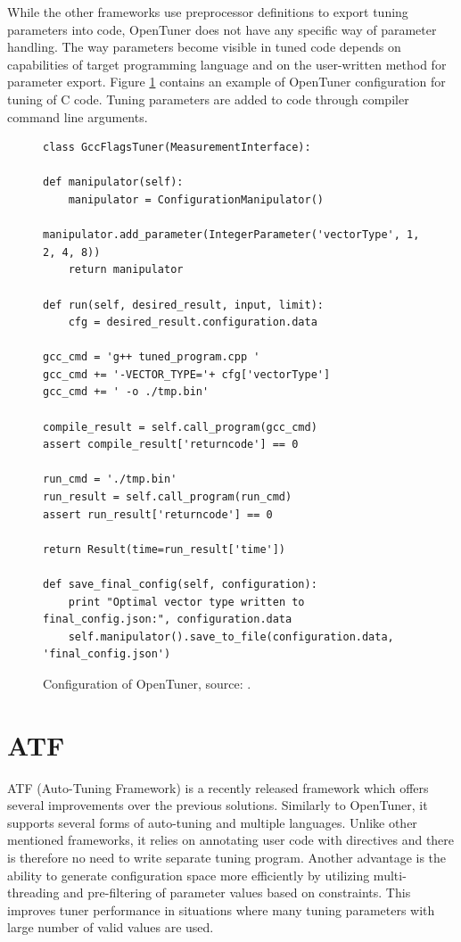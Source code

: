 \documentclass
[
    digital, %
    oneside, %
    table, %
    nolof, %
    nolot, %
    nocover %
]{fithesis3}
\begin{document}
While the other frameworks use preprocessor definitions to export tuning parameters into code, OpenTuner does not have any specific way of parameter
handling. The way parameters become visible in tuned code depends on capabilities of target programming language and on the user-written method for
parameter export. Figure \ref{opentuner-example} contains an example of OpenTuner configuration for tuning of C code. Tuning parameters are added
to code through compiler command line arguments.

\begin{figure}[ht]
\begin{adjustwidth}{-1cm}{-1cm}
\begin{lstlisting}
class GccFlagsTuner(MeasurementInterface):

def manipulator(self):
    manipulator = ConfigurationManipulator()
    manipulator.add_parameter(IntegerParameter('vectorType', 1, 2, 4, 8))
    return manipulator

def run(self, desired_result, input, limit):
    cfg = desired_result.configuration.data

gcc_cmd = 'g++ tuned_program.cpp '
gcc_cmd += '-VECTOR_TYPE='+ cfg['vectorType']
gcc_cmd += ' -o ./tmp.bin'

compile_result = self.call_program(gcc_cmd)
assert compile_result['returncode'] == 0

run_cmd = './tmp.bin'
run_result = self.call_program(run_cmd)
assert run_result['returncode'] == 0

return Result(time=run_result['time'])

def save_final_config(self, configuration):
    print "Optimal vector type written to final_config.json:", configuration.data
    self.manipulator().save_to_file(configuration.data, 'final_config.json')
\end{lstlisting}
\caption{Configuration of OpenTuner, source: \cite{opentuner}.}
\label{opentuner-example}
\end{adjustwidth}
\end{figure}

\section{ATF}
ATF (Auto-Tuning Framework) \cite{atf} is a recently released framework which offers several improvements over the previous solutions. Similarly to
OpenTuner, it supports several forms of auto-tuning and multiple languages. Unlike other mentioned frameworks, it relies on annotating user code
with directives and there is therefore no need to write separate tuning program. Another advantage is the ability to generate configuration space
more efficiently by utilizing multi-threading and pre-filtering of parameter values based on constraints. This improves tuner performance in
situations where many tuning parameters with large number of valid values are used.
\end{document}
